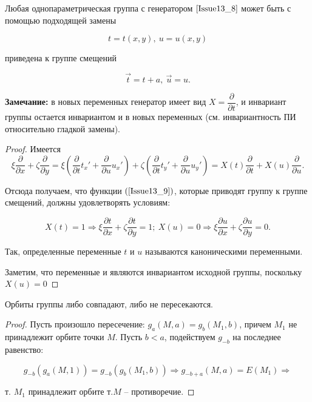 \begin{theorem}
Любая однопараметрическая группа с генератором $\ref{Issue13_8}$ может быть с помощью подходящей замены 

\begin{equation}
	t = t(x,y),\ u = u(x,y)
	\label{Issue13_9}
\end{equation}

приведена к группе смещений 

\begin{equation}
	\vec{t} = t + a,\ \vec{u} = u.
	\label{Issue13_10}
\end{equation}

\textbf{Замечание:} в новых переменных генератор имеет вид $X = \dfrac{\partial}{\partial t}$, и инвариант группы остается инвариантом и в новых переменных (см. инвариантность ПИ относительно гладкой замены).

\begin{proof}

Имеется \[\xi \dfrac{\partial}{\partial x} + \zeta \dfrac{\partial}{\partial y} = \xi(\dfrac{\partial}{\partial t}t_x' + \dfrac{\partial}{\partial u}u_x') + \zeta(\dfrac{\partial}{\partial t}t_y' + \dfrac{\partial}{\partial u}u_y') = X(t)\dfrac{\partial}{\partial t} + X(u)\dfrac{\partial}{\partial u}.\]

Отсюда получаем, что функции $(\ref{Issue13_9})$, которые приводят группу к группе смещений, должны удовлетворять условиям:

\begin{equation}
	X(t) = 1 \Rightarrow \xi \dfrac{\partial t}{\partial x} + \zeta \dfrac{\partial t}{\partial y} = 1;\ X(u) = 0 \Rightarrow \xi \dfrac{\partial u}{\partial x} + \zeta \dfrac{\partial u}{\partial y} = 0.
	\label{Issue13_11}
\end{equation}

Так, определенные переменные $t$ и $u$ называются $\textbf{каноническими переменными}$.

Заметим, что переменные и являются инвариантом исходной группы, поскольку \\
 $X(u) = 0$

\end{proof}
\end{theorem} 


\begin{theorem}

Орбиты группы либо совпадают, либо не пересекаются.

\begin{proof}

Пусть произошло пересечение: $g_a(M,a) = g_b(M_1,b)$, причем $M_1$ не принадлежит орбите точки $M$. Пусть $b < a$, подействуем $g_{-b}$ на последнее равенство:

\[ g_{-b}(g_a(M,1)) = g_{-b}(g_b(M_1, b)) \Rightarrow g_{-b+a}(M,a) = E(M_1) \Rightarrow\]

т. $M_1$ принадлежит орбите т.$M$ -- противоречие.

\end{proof}

\end{theorem}


